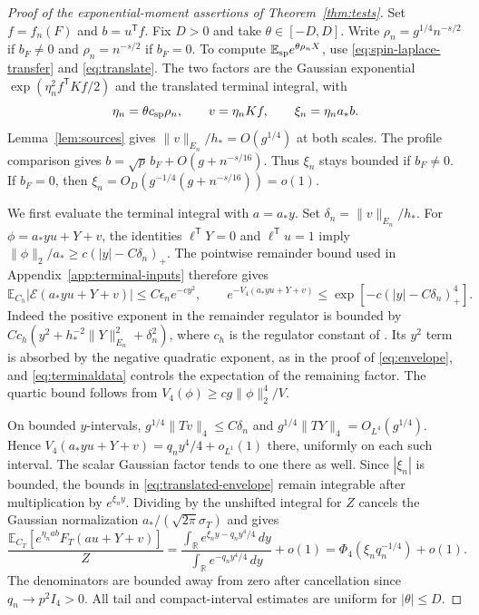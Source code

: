 \documentclass[11pt]{article}
\numberwithin{equation}{section}
\newcommand{\E}{\mathbb E}
\newcommand{\R}{\mathbb R}
\begin{document}
\begin{proof}[Proof of the exponential-moment assertions of Theorem~\ref{thm:tests}]
Set $f=f_n(F)$ and $b=u^{\mathsf T}f$. Fix $D>0$ and take
$\theta\in[-D,D]$. Write $\rho_n=g^{1/4}n^{-s/2}$ if $b_F\ne0$
and $\rho_n=n^{-s/2}$ if $b_F=0$. To compute
$\E_{\rm sp}e^{\theta\rho_n X}$, use
\eqref{eq:spin-laplace-transfer} and \eqref{eq:translate}.
The two factors are the Gaussian exponential
$\exp(\eta_n^2 f^{\mathsf T}Kf/2)$ and the translated terminal
integral, with
\begin{equation}
 \eta_n=\theta c_{\rm sp}\rho_n,\qquad v=\eta_n Kf,\qquad
 \xi_n=\eta_n a_* b .
\end{equation}
Lemma~\ref{lem:sources} gives $\|v\|_{E_n}/h_*=O(g^{1/4})$ at both
scales. The profile comparison gives
$b=\sqrt p\,b_F+O(g+n^{-s/16})$. Thus $\xi_n$ stays bounded if
$b_F\ne0$. If $b_F=0$, then
$\xi_n=O_D(g^{-1/4}(g+n^{-s/16}))=o(1)$.

We first evaluate the terminal integral with $a=a_*y$. Set
$\delta_n=\|v\|_{E_n}/h_*$. For $\phi=a_*yu+Y+v$, the identities
$\ell^{\mathsf T}Y=0$ and $\ell^{\mathsf T}u=1$ imply
$\|\phi\|_2/a_*\ge c(|y|-C\delta_n)_+$. The pointwise remainder
bound used in Appendix~\ref{app:terminal-inputs} therefore gives
\begin{equation}
 \E_{C_h}|\mathcal E(a_*yu+Y+v)|\le C\epsilon_n e^{-c y^2},
 \qquad
 e^{-V_4(a_*yu+Y+v)}\le \exp[-c(|y|-C\delta_n)_+^4].
 \label{eq:translated-envelope}
\end{equation}
Indeed the positive exponent in the remainder regulator is bounded by
$C c_h(y^2+h_*^{-2}\|Y\|_{E_n}^2+\delta_n^2)$, where $c_h$ is the
regulator constant of \cite[Assumption~7.1]{base}. Its $y^2$ term is
absorbed by the negative quadratic exponent, as in the proof of
\eqref{eq:envelope}, and \eqref{eq:terminaldata} controls the
expectation of the remaining factor. The quartic bound follows from
$V_4(\phi)\ge c g\|\phi\|_2^4/V$.

On bounded $y$-intervals, $g^{1/4}\|Tv\|_4\le C\delta_n$ and
$g^{1/4}\|TY\|_4=O_{L^4}(g^{1/4})$. Hence
$V_4(a_*yu+Y+v)=q_n y^4/4+o_{L^1}(1)$ there, uniformly on each
such interval. The scalar Gaussian factor tends to one there as well.
Since $|\xi_n|$ is bounded, the bounds in
\eqref{eq:translated-envelope} remain integrable after multiplication
by $e^{\xi_n y}$. Dividing by the unshifted integral for $Z$ cancels
the Gaussian normalization $a_*/(\sqrt{2\pi}\sigma_T)$ and gives
\begin{equation}
 \frac{\E_{C_T}\!\left[e^{\eta_n a b}F_T(au+Y+v)\right]}{Z}
 =\frac{\int_{\R}e^{\xi_n y-q_n y^4/4}\,dy}
        {\int_{\R}e^{-q_n y^4/4}\,dy}+o(1)
 =\Phi_4(\xi_n q_n^{-1/4})+o(1).
 \label{eq:terminal-laplace}
\end{equation}
The denominators are bounded away from zero after cancellation since
$q_n\to p^2 I_4>0$. All tail and compact-interval estimates are
uniform for $|\theta|\le D$.


\end{proof}
\end{document}
